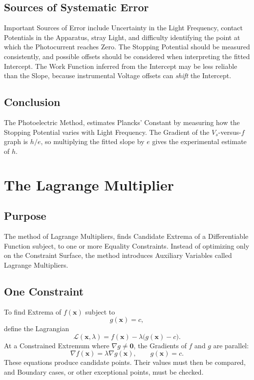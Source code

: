 \documentclass[a4paper, 10pt, onepage]{elegantbook}
\begin{document}
{\subsection{Sources of Systematic Error}

Important Sources of Error include Uncertainty in the Light Frequency, contact Potentials in the Apparatus, stray 
Light, and difficulty identifying the point at which the Photocurrent reaches Zero. The Stopping Potential should be 
measured consistently, and possible offsets should be considered when interpreting the fitted
Intercept. The Work Function inferred from the Intercept may be less reliable than the Slope, because instrumental 
Voltage offsets can \emph{shift} the Intercept.

\subsection{Conclusion}

The Photoelectric Method, estimates Plancks' Constant by measuring how
the Stopping Potential varies with Light Frequency. The Gradient of the \(V_s\)-versus-\(f\) graph is \(h/e\), so 
multiplying the fitted
slope by \(e\) gives the experimental estimate of \(h\).







\section{The Lagrange Multiplier}

\subsection{Purpose}

The method of Lagrange Multipliers, finds Candidate Extrema of a Differentiable Function subject, to one or more 
Equality Constraints. Instead of optimizing only on the Constraint Surface, the method introduces Auxiliary Variables 
called Lagrange Multipliers.

\subsection{One Constraint}

To find Extrema of \(f(\mathbf{x})\) subject to
\[
g(\mathbf{x})=c,
\]
define the Lagrangian
\[
\mathcal{L}(\mathbf{x},\lambda)
=f(\mathbf{x})-\lambda\bigl(g(\mathbf{x})-c\bigr).
\]
At a Constrained Extremum where \(\nabla g\ne\mathbf{0}\), the
Gradients of \(f\) and \(g\) are parallel:
\[
\boxed{
\nabla f(\mathbf{x})=\lambda\nabla g(\mathbf{x}),
\qquad
g(\mathbf{x})=c.
}
\]
These equations produce candidate points. Their values must then be compared, and Boundary cases, or other exceptional 
points, must be checked.

}
\end{document}
